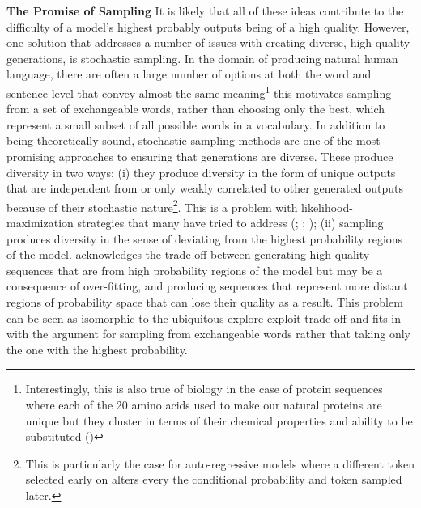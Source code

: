 \documentclass{article}
\begin{document}
\textbf{The Promise of Sampling}
It is likely that all of these ideas contribute to the difficulty of a model's highest probably outputs being of a high quality. However, one solution that addresses a number of issues with creating diverse, high quality generations, is stochastic sampling. In the domain of producing natural human language, there are often a large number of options at both the word and sentence level that convey almost the same meaning\footnote{Interestingly, this is also true of biology in the case of protein sequences where each of the 20 amino acids used to make our natural proteins are unique but they cluster in terms of their chemical properties and ability to be substituted (\cite{BLOSUM})} this motivates sampling from a set of exchangeable words, rather than choosing only the best, which represent a small subset of all possible words in a vocabulary. In addition to being theoretically sound, stochastic sampling methods are one of the most promising approaches to ensuring that generations are diverse. These produce diversity in two ways: (i) they produce diversity in the form of unique outputs that are independent from or only weakly correlated to other generated outputs because of their stochastic nature\footnote{This is particularly the case for auto-regressive models where a different token selected early on alters every the conditional probability and token sampled later.}. This is a problem with likelihood-maximization strategies that many have tried to address (\cite{BeamComparison}; \cite{DiverseBeamSearch}; \cite{IterativeBeamSearch}); (ii) sampling produces diversity in the sense of deviating from the highest probability regions of the model. \cite{HUSE} acknowledges the trade-off between generating high quality sequences that are from high probability regions of the model but may be a consequence of over-fitting, and producing sequences that represent more distant regions of probability space that can lose their quality as a result. This problem can be seen as isomorphic to the ubiquitous explore exploit trade-off and fits in with the argument for sampling from exchangeable words rather that taking only the one with the highest probability. 
\end{document}
